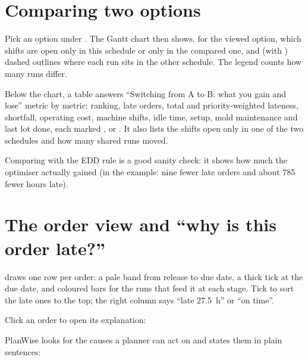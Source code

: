 \section{Comparing two options}\label{sec:compare}

Pick an option under . The Gantt chart then shows, for the viewed option, which shifts are
open only in this schedule or only in the compared one, and (with )
dashed outlines where each run sits in the other schedule. The legend counts how many runs differ.


Below the chart, a table answers ``Switching from A to B: what you gain and lose'' metric by metric: ranking,
late orders, total and priority-weighted lateness, shortfall, operating cost, machine shifts, idle time,
setup, mold maintenance and last lot done, each marked ,  or . It also lists
the shifts open only in one of the two schedules and how many shared runs moved.


\begin{tip}
Comparing with the EDD rule is a good sanity check: it shows how much the optimiser actually gained (in the
example: nine fewer late orders and about 785 fewer hours late).
\end{tip}

\section{The order view and ``why is this order late?''}\label{sec:why-late}

 draws one row per order: a pale band from release to due date, a thick tick at the due date,
and coloured bars for the runs that feed it at each stage. Tick  to sort the late ones to
the top; the right column says ``late 27.5~h'' or ``on time''.


Click an order to open its explanation:


PlanWise looks for the causes a planner can act on and states them in plain sentences:

